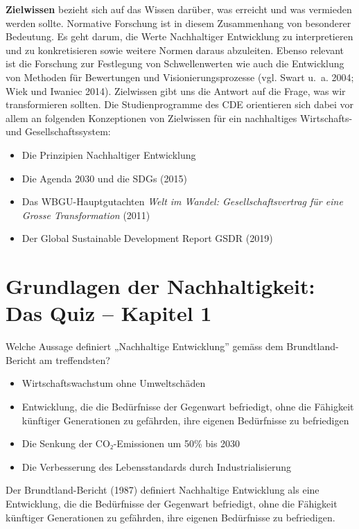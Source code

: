 \documentclass[
  nswissgerman,
  a4paper,
  openany]{book}
\providecommand{\tightlist}{%
  \setlength{\itemsep}{0pt}\setlength{\parskip}{0pt}}
\begin{document}
\textbf{Zielwissen} bezieht sich auf das Wissen darüber, was erreicht
und was vermieden werden sollte. Normative Forschung ist in diesem
Zusammenhang von besonderer Bedeutung. Es geht darum, die Werte
Nachhaltiger Entwicklung zu interpretieren und zu konkretisieren sowie
weitere Normen daraus abzuleiten. Ebenso relevant ist die Forschung zur
Festlegung von Schwellenwerten wie auch die Entwicklung von Methoden für
Bewertungen und Visionierungsprozesse (vgl. Swart u.~a. 2004; Wiek und
Iwaniec 2014). Zielwissen gibt uns die Antwort auf die Frage, was wir
transformieren sollten. Die Studienprogramme des CDE orientieren sich
dabei vor allem an folgenden Konzeptionen von Zielwissen für ein
nachhaltiges Wirtschafts- und Gesellschaftssystem:

\begin{itemize}
\tightlist
\item
  Die Prinzipien Nachhaltiger Entwicklung
\item
  Die Agenda 2030 und die SDGs (2015)
\item
  Das WBGU-Hauptgutachten \emph{Welt im Wandel: Gesellschaftsvertrag für
  eine Grosse Transformation} (2011)
\item
  Der Global Sustainable Development Report GSDR (2019)
\end{itemize}

\section{Grundlagen der Nachhaltigkeit: Das Quiz -- Kapitel
1}\label{grundlagen-der-nachhaltigkeit-das-quiz-kapitel-1}

Welche Aussage definiert „Nachhaltige Entwicklung'' gemäss dem
Brundtland-Bericht am treffendsten?

\begin{itemize}
\tightlist
\item[$\square$]
  Wirtschaftswachstum ohne Umweltschäden
\item[$\square$]
  Entwicklung, die die Bedürfnisse der Gegenwart befriedigt, ohne die
  Fähigkeit künftiger Generationen zu gefährden, ihre eigenen
  Bedürfnisse zu befriedigen
\item[$\square$]
  Die Senkung der CO₂-Emissionen um 50\% bis 2030
\item[$\square$]
  Die Verbesserung des Lebensstandards durch Industrialisierung
\end{itemize}

Der Brundtland-Bericht (1987) definiert Nachhaltige Entwicklung als eine
Entwicklung, die die Bedürfnisse der Gegenwart befriedigt, ohne die
Fähigkeit künftiger Generationen zu gefährden, ihre eigenen Bedürfnisse
zu befriedigen.
\end{document}
